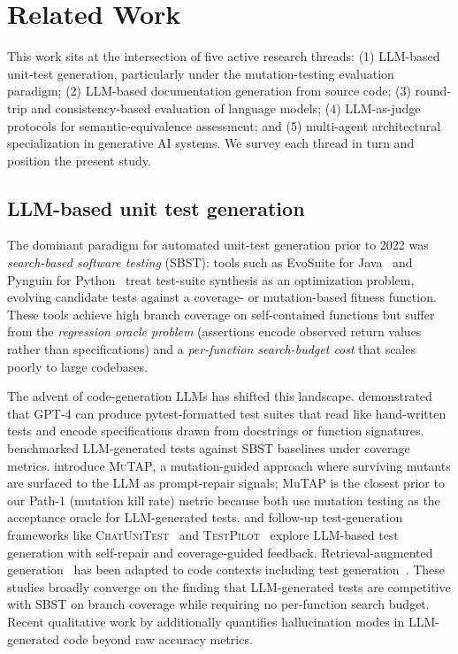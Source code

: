 \section{Related Work}
\label{sec:related_work}

This work sits at the intersection of five active research threads: (1) LLM-based unit-test generation, particularly under the mutation-testing evaluation paradigm; (2) LLM-based documentation generation from source code; (3) round-trip and consistency-based evaluation of language models; (4) LLM-as-judge protocols for semantic-equivalence assessment; and (5) multi-agent architectural specialization in generative AI systems. We survey each thread in turn and position the present study.

\subsection{LLM-based unit test generation}

The dominant paradigm for automated unit-test generation prior to 2022 was \emph{search-based software testing} (SBST): tools such as EvoSuite for Java~\citep{Fraser2011EvoSuite} and Pynguin for Python~\citep{Lukasczyk2022Pynguin} treat test-suite synthesis as an optimization problem, evolving candidate tests against a coverage- or mutation-based fitness function. These tools achieve high branch coverage on self-contained functions but suffer from the \emph{regression oracle problem} (assertions encode observed return values rather than specifications) and a \emph{per-function search-budget cost} that scales poorly to large codebases.

The advent of code-generation LLMs has shifted this landscape. \citet{Schafer2023LLMTest} demonstrated that GPT-4 can produce pytest-formatted test suites that read like hand-written tests and encode specifications drawn from docstrings or function signatures. \citet{Tufano2022LLMTest} benchmarked LLM-generated tests against SBST baselines under coverage metrics. \citet{Dakhel2024MuTAP} introduce \textsc{MuTAP}, a mutation-guided approach where surviving mutants are surfaced to the LLM as prompt-repair signals; MuTAP is the closest prior to our Path-1 (mutation kill rate) metric because both use mutation testing as the acceptance oracle for LLM-generated tests. \citet{Chen2023CodeT} and follow-up test-generation frameworks like \textsc{ChatUniTest}~\citep{Xie2024ChatUniTest} and \textsc{TestPilot}~\citep{Schafer2024TestPilot} explore LLM-based test generation with self-repair and coverage-guided feedback. Retrieval-augmented generation~\citep{Lewis2020RAG} has been adapted to code contexts including test generation~\citep{Zhang2023RAGCode}. These studies broadly converge on the finding that LLM-generated tests are competitive with SBST on branch coverage while requiring no per-function search budget. Recent qualitative work by \citet{Kang2025LLMHallucinationInCode} additionally quantifies hallucination modes in LLM-generated code beyond raw accuracy metrics.

